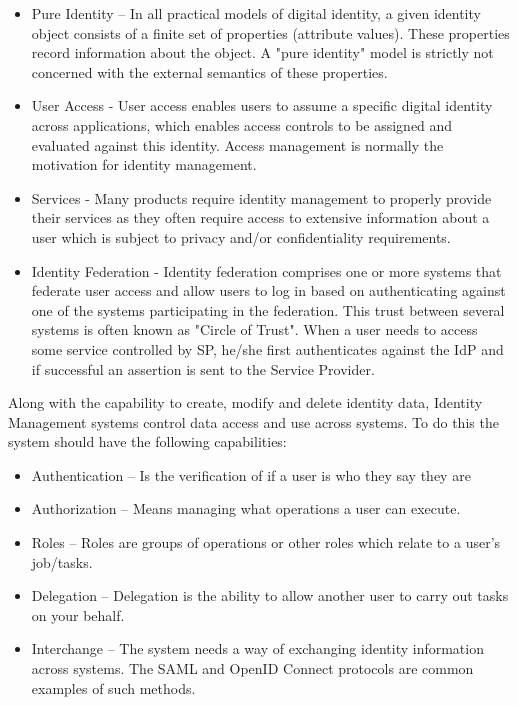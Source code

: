 \begin{itemize}
	\item Pure Identity – In all practical models of digital identity, a given identity object consists of a finite set of properties (attribute values). These properties record information about the object. A "pure identity" model is strictly not concerned with the external semantics of these properties.
	\item User Access - User access enables users to assume a specific digital identity across applications, which enables access controls to be assigned and evaluated against this identity. Access management is normally the motivation for identity management.
	\item Services - Many products require identity management to properly provide their services as they often require access to extensive information about a user which is subject to privacy and/or confidentiality requirements.
	\item Identity Federation - Identity federation comprises one or more systems that federate user access and allow users to log in based on authenticating against one of the systems participating in the federation. This trust between several systems is often known as "Circle of Trust". When a user needs to access some service controlled by SP, he/she first authenticates against the IdP and if successful an assertion is sent to the Service Provider.
\end{itemize}

Along with the capability to create, modify and delete identity data, Identity Management systems control data access and use across systems. To do this the system should have the following capabilities:

\begin{itemize}
	\item Authentication – Is the verification of if a user is who they say they are
	\item Authorization – Means managing what operations a user can execute.
	\item Roles – Roles are groups of operations or other roles which relate to a user’s job/tasks.
	\item Delegation – Delegation is the ability to allow another user to carry out tasks on your behalf.
	\item Interchange – The system needs a way of exchanging identity information across systems. The SAML and OpenID Connect protocols are common examples of such methods.
\end{itemize}


